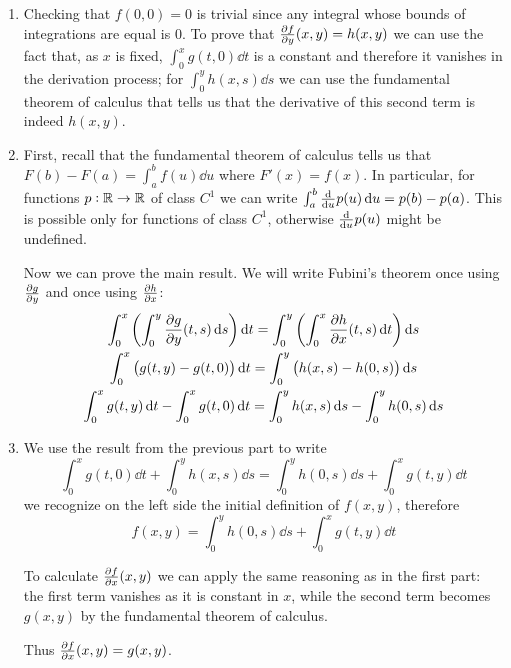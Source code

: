 \documentclass[12pt]{extarticle}
\begin{document}
\begin{enumerate}[label=\alph*.]
    \item Checking that $f(0,0) = 0$ is trivial since any integral whose bounds of integrations are equal is 0.
          To prove that $\pdv{f}{y}()(x,y) = h(x, y)$ we can use the fact that, as $x$ is fixed, $\int_0^x g(t,0) \dd{t}$ is a constant and therefore it vanishes in the derivation process; for $\int_0^y h(x, s) \dd{s}$ we can use the fundamental theorem of calculus that tells us that the derivative of this second term is indeed $h(x, y)$.
    \item First, recall that the fundamental theorem of calculus tells us that $F(b) - F(a) = \int_a^b f(u) \dd{u}$ where $F'(x) = f(x)$. In particular, for functions $p: \mathbb{R} \to \mathbb{R}$ of class $C^1$ we can write $\int_a^b \dv{u} p(u) \dd{u} = p(b) - p(a)$.
          This is possible only for functions of class $C^1$, otherwise $\dv{u} p(u)$ might be undefined.

          Now we can prove the main result.
          We will write Fubini's theorem once using $\pdv{g}{y}$ and once using $\pdv{h}{x}$:
          \begin{gather*}
              \int_0^x \left(\int_0^y \pdv{g}{y}()(t, s) \dd{s} \right) \dd{t} = \int_0^y \left(\int_0^x \pdv{h}{x}()(t, s) \dd{t} \right) \dd{s} \\
              \int_0^x \left(g(t, y) - g(t,  0)\right) \dd{t} = \int_0^y \left( h(x, s) - h(0, s)\right) \dd{s} \\
              \int_0^x g(t, y) \dd{t} - \int_0^x g(t,  0) \dd{t} = \int_0^y h(x, s) \dd{s} - \int_0^y h(0, s) \dd{s} \\
          \end{gather*}
    \item We use the result from the previous part to write
          $$
              \int_0^x g(t, 0) \dd{t} + \int_0^y h(x, s) \dd{s} = \int_0^y h(0, s) \dd{s} + \int_0^x g(t, y) \dd{t}
          $$
          we recognize on the left side the initial definition of $f(x, y)$, therefore
          $$
              f(x, y) = \int_0^y h(0, s) \dd{s} + \int_0^x g(t, y) \dd{t}
          $$

          To calculate $\pdv{f}{x}()(x, y)$ we can apply the same reasoning as in the first part:
          the first term vanishes as it is constant in $x$, while the second term becomes $g(x, y)$ by the fundamental theorem of calculus.

          Thus $\pdv{f}{x}()(x, y) = g(x, y)$.
\end{enumerate}
\end{document}
